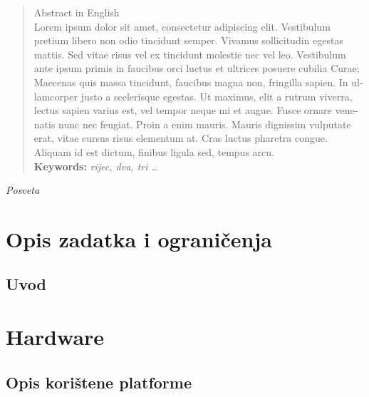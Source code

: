 \documentclass[11pt,a4paper,twoside,openright]{report}
\begin{document}
\begin{titlepage}
\begin{otherlanguage}{english} 
\begin{abstract}
Abstract in English\\
Lorem ipsum dolor sit amet, consectetur adipiscing elit. Vestibulum pretium libero non odio tincidunt semper. Vivamus sollicitudin egestas mattis. Sed vitae risus vel ex tincidunt molestie nec vel leo. Vestibulum ante ipsum primis in faucibus orci luctus et ultrices posuere cubilia Curae; Maecenas quis massa tincidunt, faucibus magna non, fringilla sapien. In ullamcorper justo a scelerisque egestas. Ut maximus, elit a rutrum viverra, lectus sapien varius est, vel tempor neque mi et augue. Fusce ornare venenatis nunc nec feugiat. Proin a enim mauris. Mauris dignissim vulputate erat, vitae cursus risus elementum at. Cras luctus pharetra congue. Aliquam id est dictum, finibus ligula sed, tempus arcu. \\

\textbf{Keywords:} \textit{rijec, dva, tri \ldots}

\end{abstract}
\end{otherlanguage}

\end{titlepage}
\newpage

\vspace*{\fill}
\begin{flushright}
\textit{Posveta}
\end{flushright}
\vspace*{\fill}



\tableofcontents
\listoftables	%
\listoffigures	%
\newpage



\chapter{Opis zadatka i ograničenja}\label{OpisIOgranicenja}
\section{Uvod}
\chapter{Hardware}
\section{Opis korištene platforme}
\end{document}
